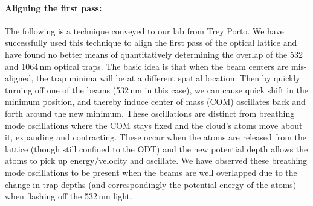 \paragraph{Aligning the first pass:}
The following is a technique conveyed to our lab from Trey Porto.
We have successfully used this technique to align the first pass of the optical lattice and have found no better means of quantitatively determining the overlap of the 532 and 1064\,nm optical traps.
The basic idea is that when the beam centers are mis-aligned, the trap minima will be at a different spatial location.
Then by quickly turning off one of the beams (532\,nm in this case), we can cause quick shift in the minimum position, and thereby induce center of mass (COM) oscillates back and forth around the new minimum.
These oscillations are distinct from breathing mode oscillations where the COM stays fixed and the cloud's atoms move about it, expanding and contracting. 
These occur when the atoms are released from the lattice (though still confined to the ODT) and the new potential depth allows the atoms to pick up energy/velocity and oscillate.
We have observed these breathing mode oscillations to be present when the beams are well overlapped due to the change in trap depths (and correspondingly the potential energy of the atoms) when flashing off the 532\,nm light.

